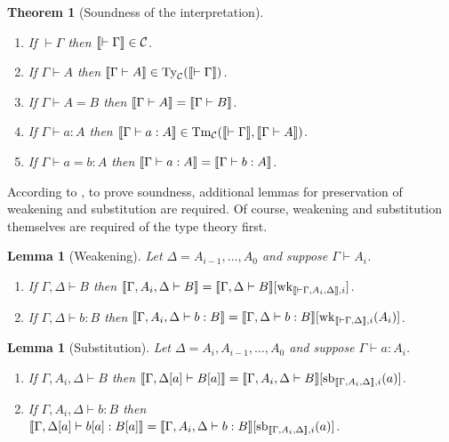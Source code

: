 \documentclass{article}
\renewcommand{\_}{\textrm{\textscale{.5}{\textunderscore}}}
\DeclarePairedDelimiter{\interp}{\llbracket}{\rrbracket}
\newcommand{\Tm}{\mathrm{Tm}}
\newcommand{\Ty}{\mathrm{Ty}}
\newcommand{\wk}{\mathrm{wk}}
\renewcommand{\sb}{\mathrm{sb}}
\theoremstyle{definition}
\theoremstyle{plain}
\newtheorem{theorem}[definition]{Theorem}
\newtheorem{lemma}[definition]{Lemma}
\begin{document}
\begin{theorem}[Soundness of the interpretation] \hfill
\begin{enumerate}
    \item If $\vdash \Gamma$ then $\interp{\vdash \Gamma} \in \mathcal{C}$.
    \item If $\Gamma \vdash A$ then $\interp{\Gamma \vdash A} \in \Ty_{\mathcal{C}}(\interp{\vdash \Gamma})$.
    \item If $\Gamma \vdash A = B$ then $\interp{\Gamma \vdash A} = \interp{\Gamma \vdash B}$.
    \item If $\Gamma \vdash a : A$ then $\interp{\Gamma \vdash a : A} \in \Tm_{\mathcal{C}}(\interp{\vdash \Gamma}, \interp{\Gamma \vdash A})$.
    \item If $\Gamma \vdash a = b : A$ then $\interp{\Gamma \vdash a : A} = \interp{\Gamma \vdash b : A}$.
\end{enumerate}
\end{theorem}

According to \citet{synsem}, to prove soundness, additional lemmas for preservation of weakening and substitution are required.
Of course, weakening and substitution themselves are required of the type theory first.

\begin{lemma}[Weakening] Let $\Delta = A_{i-1}, \dots, A_0$ and suppose $\Gamma \vdash A_i$. \hfill
\begin{enumerate}
    \item If $\Gamma, \Delta \vdash B$ then $\interp{\Gamma, A_i, \Delta \vdash B} = \interp{\Gamma, \Delta \vdash B}[\wk_{\interp{\vdash \Gamma, A_i, \Delta}, i}]$.
    \item If $\Gamma, \Delta \vdash b : B$ then $\interp{\Gamma, A_i, \Delta \vdash b : B} = \interp{\Gamma, \Delta \vdash b : B}[\wk_{\interp{\vdash \Gamma, \Delta}, i}(A_i)]$.
\end{enumerate}
\end{lemma}

\begin{lemma}[Substitution] Let $\Delta = A_i, A_{i-1}, \dots, A_0$ and suppose $\Gamma \vdash a : A_i$. \hfill
\begin{enumerate}
    \item If $\Gamma, A_i, \Delta \vdash B$ then $\interp{\Gamma, \Delta[a] \vdash B[a]} = \interp{\Gamma, A_i, \Delta \vdash B}[\sb_{\interp{\Gamma, A_i, \Delta}, i}(a)]$.
    \item If $\Gamma, A_i, \Delta \vdash b : B$ then $\interp{\Gamma, \Delta[a] \vdash b[a] : B[a]} = \interp{\Gamma, A_i, \Delta \vdash b : B}[\sb_{\interp{\Gamma, A_i, \Delta}, i}(a)]$.
\end{enumerate}
\end{lemma}
\end{document}
